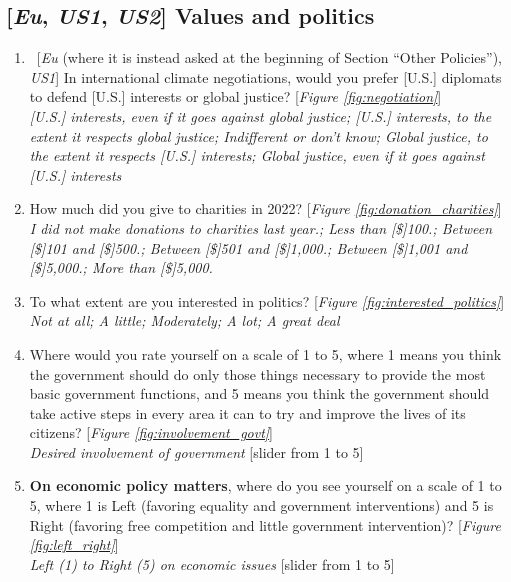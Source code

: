 \subsection*{[\textit{Eu}, \textit{US1}, \textit{US2}] Values and politics}
\begin{enumerate}[resume] \item ~[\textit{Eu} (where it is instead asked at the beginning of Section ``Other Policies''), \textit{US1}] \label{q:negotiation} In international climate negotiations, would you prefer [U.S.] diplomats to defend [U.S.] interests or global justice? [\textit{Figure \ref{fig:negotiation}}]
\\ \textit{[U.S.] interests, even if it goes against global justice; [U.S.] interests, to the extent it respects global justice; Indifferent or don't know; Global justice, to the extent it respects [U.S.] interests; Global justice, even if it goes against [U.S.] interests}
\item \label{q:donation_charities} How much did you give to charities in 2022? [\textit{Figure \ref{fig:donation_charities}}]
\\ \textit{I did not make donations to charities last year.; Less than [\$]100.; Between [\$]101 and [\$]500.; Between [\$]501 and [\$]1,000.; Between [\$]1,001 and [\$]5,000.; More than [\$]5,000.}
\item \label{q:interested_politics} To what extent are you interested in politics? [\textit{Figure \ref{fig:interested_politics}}]
\\ \textit{Not at all; A little; Moderately; A lot; A great deal}
\item \label{q:involvement_govt} Where would you rate yourself on a scale of 1 to 5, where 1 means you think the government should do only those things necessary to provide the most basic government functions, and 5 means you think the government should take active steps in every area it can to try and improve the lives of its citizens? [\textit{Figure \ref{fig:involvement_govt}}]
\\ \textit{Desired involvement of government} [slider from 1 to 5]
\item \label{q:left_right} \textbf{On economic policy matters}, where do you see yourself on a scale of 1 to 5, where 1 is Left (favoring equality and government interventions) and 5 is Right (favoring free competition and little government intervention)? [\textit{Figure \ref{fig:left_right}}]
\\ \textit{Left (1) to Right (5) on economic issues} [slider from 1 to 5]

\end{enumerate}
